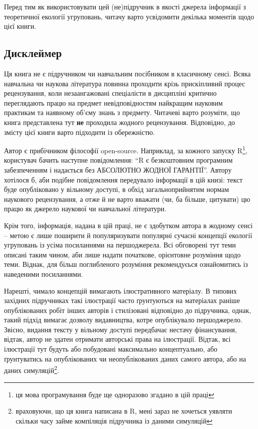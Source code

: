 \documentclass[
  11pt,
]{book}
\begin{document}
Перед тим як використовувати цей (не)підручник в якості джерела
інформації з теоретичної екології угруповань, читачу варто усвідомити
декілька моментів щодо цієї книги.

\subsection{Дисклеймер}\label{readme}

Ця книга не є підручником чи навчальним посібником в класичному сенсі.
Всяка навчальна чи наукова література повинна проходити крізь
прискіпливий процес рецензування, коли незаангажовані спеціалісти в
дисципліні критично переглядають працю на предмет невідповідностям
найкращим науковим практикам та наявному об'єму знань з предмету.
Читачеві варто розуміти, що книга представлена тут \textbf{не} проходила
жодного рецензування. Відповідно, до змісту цієї книги варто підходити
із обережністю.

Автор є прибічником філософії open-source. Наприклад, за кожного запуску
R\footnote{ця мова програмування буде ще одноразово згадано в цій праці},
користувач бачить наступне повідомлення: ``R є безкоштовним програмним
забезпеченням і надається без АБСОЛЮТНО ЖОДНОЇ ГАРАНТІЇ''. Автору
хотілося б, аби подібне повідомлення передувало інформації в цій книзі:
текст буде опубліковано у вільному доступі, в обхід загальноприйнятим
нормам наукового рецензування, а отже й не варто вважати (чи, ба більше,
цитувати) цю працю як джерело наукової чи навчальної літератури.

Крім того, інформація, надана в цій праці, не є здобутком автора в
жодному сенсі -- метою є лише поширити й популяризувати популярні
сучасні концепції екології угруповань із усіма посиланнями на
першоджерела. Всі обговорені тут теми описані таким чином, аби лише
надати початкове, орієнтовне розуміння щодо теми. Віднак, для більш
поглибленого розуміння рекомендуєься ознайомитись із наведеними
посиланнями.

Нарешті, чимало концепцій вимагають ілюстративного матеріалу. В типових
західних підручниках такі ілюстрації часто ґрунтуються на матеріалах
раніше опублікованих робіт інших авторів і стилізовані відповідно до
підручника, однак, такий підхід вимагає дозволу видавництва, котре
опублікувало першоджерело. Звісно, видання тексту у вільному доступі
передбачає нестачу фінансування, відтак, автор не здатен отримати
авторські права на ілюстрації. Відтак, всі ілюстрації тут будуть або
побудовані максимально концептуально, або ґрунтуватись на опублікованих
чи неопублікованих даних самого автора, або на даних
симуляцій\footnote{враховуючи, що ця книга написана в R, мені зараз не
  хочеться уявляти скільки часу займе компіляція підручника із даними
  симуляцій}.
\end{document}
